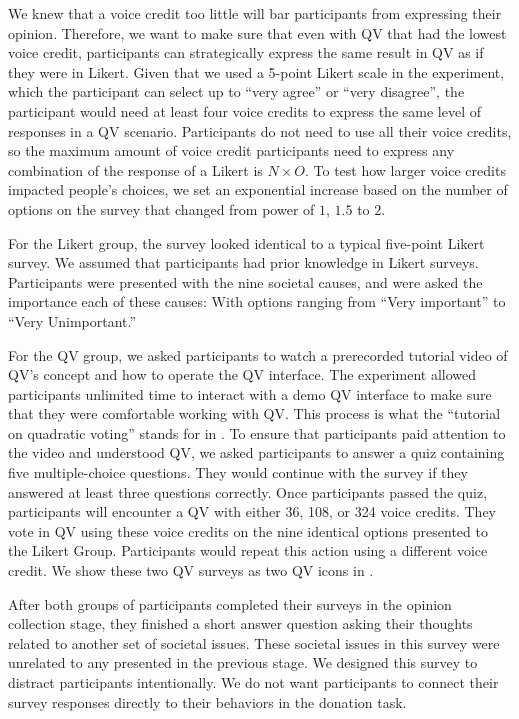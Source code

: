 We knew that a voice credit too little will bar participants from expressing their opinion. Therefore, we want to make sure that even with QV that had the lowest voice credit, participants can strategically express the same result in QV as if they were in Likert. Given that we used a 5-point Likert scale in the experiment, which the participant can select up to ``very agree''  or ``very disagree'', the participant would need at least four voice credits to express the same level of responses in a QV scenario. Participants do not need to use all their voice credits, so the maximum amount of voice credit participants need to express any combination of the response of a Likert is $N \times O$. To test how larger voice credits impacted people's choices, we set an exponential increase based on the number of options on the survey that changed from power of $1$, $1.5$ to $2$.\par

For the Likert group, the survey looked identical to a typical five-point Likert survey. We assumed that participants had prior knowledge in Likert surveys. Participants were presented with the nine societal causes, and were asked the importance each of these causes: With options ranging from ``Very important'' to ``Very Unimportant.''

For the QV group, we asked participants to watch a prerecorded tutorial video of QV's concept and how to operate the QV interface. The experiment allowed participants unlimited time to interact with a demo QV interface to make sure that they were comfortable working with QV. This process is what the ``tutorial on quadratic voting'' stands for in . To ensure that participants paid attention to the video and understood QV, we asked participants to answer a quiz containing five multiple-choice questions. They would continue with the survey if they answered at least three questions correctly. Once participants passed the quiz, participants will encounter a QV with either 36, 108, or 324 voice credits. They vote in QV using these voice credits on the nine identical options presented to the Likert Group. Participants would repeat this action using a different voice credit. We show these two QV surveys as two QV icons in .

After both groups of participants completed their surveys in the opinion collection stage, they finished a short answer question asking their thoughts related to another set of societal issues. These societal issues in this survey were unrelated to any presented in the previous stage. We designed this survey to distract participants intentionally. We do not want participants to connect their survey responses directly to their behaviors in the donation task.

